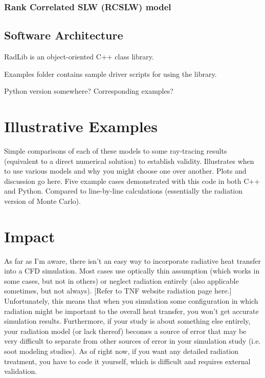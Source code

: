 \documentclass[preprint,12pt, a4paper]{elsarticle}
\begin{document}
\subsubsection{Rank Correlated SLW (RCSLW) model}
\label{s:RCSLW}

\subsection{Software Architecture}
\label{s:architechture}

RadLib is an object-oriented C++ class library. 

Examples folder contains sample driver scripts for using the library. 

Python version somewhere? Corresponding examples?

\section{Illustrative Examples}
\label{s:Examples}

Simple comparisons of each of these models to some ray-tracing results (equivalent to a direct numerical solution) to establish validity. Illustrates when to use various models and why you might choose one over another. Plots and discussion go here. Five example cases demonstrated with this code in both C++ and Python. Compared to line-by-line calculations (essentially the radiation version of Monte Carlo). 

\section{Impact}
\label{s:impact}

As far as I'm aware, there isn't an easy way to incorporate radiative heat transfer into a CFD simulation. Most cases use optically thin assumption (which works in some cases, but not in others) or neglect radiation entirely (also applicable sometimes, but not always). [Refer to TNF website radiation page here.] Unfortunately, this means that when you simulation some configuration in which radiation might be important to the overall heat transfer, you won't get accurate simulation results. Furthermore, if your study is about something else entirely, your radiation model (or lack thereof) becomes a source of error that may be very difficult to separate from other sources of error in your simulation study (i.e. soot modeling studies). As of right now, if you want any detailed radiation treatment, you have to code it yourself, which is difficult and requires external validation. 
\end{document}
